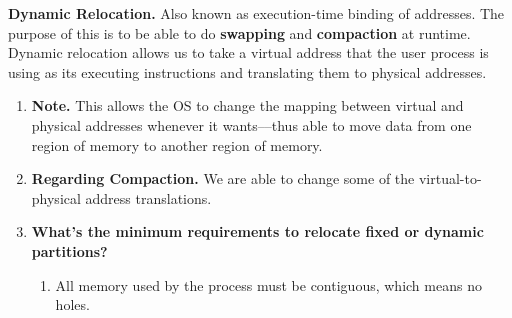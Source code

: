 \documentclass[12pt]{article}
\begin{document}
{\bf Dynamic Relocation.} {Also known as execution-time binding of addresses. The purpose of this is to be able to do {\bf swapping} and {\bf compaction} at runtime. Dynamic relocation allows us to take a virtual address that the user process is using as its executing instructions and translating them to physical addresses.}
    \begin{enumerate}
        \item[]{\bf Note.} {This allows the OS to change the mapping between virtual and physical addresses whenever it wants––thus able to move data from one region of memory to another region of memory.}
        \item[] {\bf Regarding Compaction.} {We are able to change some of the virtual-to-physical address translations.}
        \item[] {\bf What's the minimum requirements to relocate fixed or dynamic partitions?} 
        \vspace{-0.5em}
        \begin{enumerate}
            \item[] All memory used by the process must be contiguous, which means no holes. 
        \end{enumerate}
    \end{enumerate}
\end{document}
